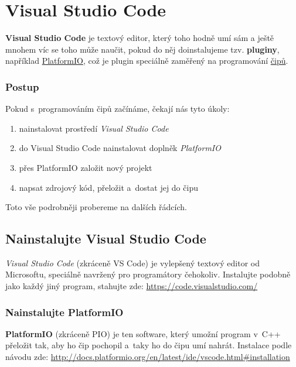  \section{Visual Studio Code} \label{vscode}
 
 \textbf{Visual Studio Code} je textový editor, který toho hodně umí sám a ještě mnohem víc se toho může naučit, pokud do něj doinstalujeme tzv. \textbf{pluginy}, 
 například  \hyperref[platformio]{PlatformIO}, což je plugin speciálně zaměřený na programování \hyperref[cip]{čipů}. 
 
 \subsubsection*{Postup}
 
 Pokud s~programováním čipů začínáme, čekají nás tyto úkoly:
 \begin{enumerate}
 	\item  nainstalovat prostředí {\it Visual Studio Code}
 	\item  do Visual Studio Code nainstalovat doplněk {\it PlatformIO }
 	\item  přes PlatformIO založit nový projekt
 	\item  napsat zdrojový kód, přeložit a~dostat jej do čipu 
 \end{enumerate}
 Toto vše podrobněji probereme na dalších řádcích. 
 
 \label{vsc} \subsection{Nainstalujte  Visual Studio Code} 
 
 {\it Visual Studio Code}  (zkráceně VS Code) 
 je vylepšený textový editor od Microsoftu, speciálně navržený pro programátory čehokoliv.
 Instalujte podobně jako každý jiný program, stahujte zde: \url{https://code.visualstudio.com/}  
 
 
 \subsubsection{Nainstalujte PlatformIO} \label{platformio}
 
  \textbf{PlatformIO} (zkráceně PIO) je ten software, který umožní program v~C++ 
 přeložit tak, aby ho čip pochopil a~taky ho do čipu umí nahrát. 
 Instalace podle návodu zde: \url{http://docs.platformio.org/en/latest/ide/vscode.html\#installation}
 
